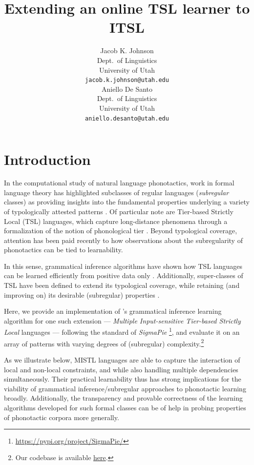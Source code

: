 \documentclass[11pt]{article}
\title{Extending an online TSL learner to ITSL}
\author{Jacob K. Johnson \\
Dept.\ of Linguistics\\
  University of Utah\\
  \small\texttt{jacob.k.johnson@utah.edu}\\
  \And 
  Aniello De Santo \\
  Dept.\ of Linguistics\\
  University of Utah\\
  \small\texttt{aniello.desanto@utah.edu}}
\begin{document}
\maketitle

\section{Introduction}
In the computational study of natural language phonotactics, work in formal language theory has highlighted subclasses of regular languages (\emph{subregular} classes) as providing insights into the fundamental properties underlying a variety of typologically attested patterns \citep{McNaughtonPapert71,chandlee2017computational}.\@
    Of particular note are Tier-based Strictly Local (TSL) languages, which capture long-distance phenomena through a formalization of the notion of phonological tier \citep{heinz2011tier}.\@ 
    Beyond typological coverage, attention has been paid recently to how observations about the subregularity of phonotactics can be tied to learnability.
    
    In this sense, grammatical inference algorithms have shown how TSL languages can be learned efficiently from positive data only \citep{jardine2016learning,jardinemcmullin17}.\@
    Additionally, super-classes of TSL have been defined to extend its typological coverage, while retaining (and improving on) its desirable (subregular) properties \citep[a.o.]{GrafMayer18}.
    
    Here, we provide an implementation of  \citet{de2021learning}'s grammatical inference learning algorithm for one such extension --- \emph{Multiple Input-sensitive Tier-based Strictly Local} languages \citep[MITSL;][]{de2019structure} --- following the standard of \emph{SigmaPie}  \citep{aksenova2020tool}\footnote{\href{https://pypi.org/project/SigmaPie/}{https://pypi.org/project/SigmaPie/}}, and evaluate it on an array of patterns with varying degrees of (subregular) complexity.\footnote{Our codebase is available \href{https://osf.io/w9prd/?view_only=d77df5dea63841fb8f749357f29df9e1}{here}.}
    
    As we illustrate below, MISTL languages are able to capture the interaction of local and non-local constraints, and while also handling multiple dependencies simultaneously.
    Their practical learnability thus has strong implications for the viability of grammatical inference/subregular approaches to phonotactic learning broadly.
    Additionally, the transparency and provable correctness of the learning algorithms developed for such formal classes can be of help in probing properties of phonotactic corpora more generally.
    
\end{document}
